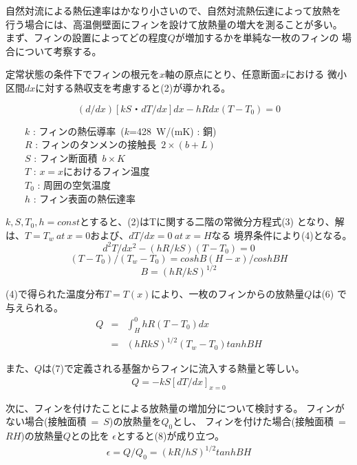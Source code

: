 \documentclass[twocolumn, 10pt,a4j]{jsarticle}
\begin{document}
  自然対流による熱伝達率はかなり小さいので、自然対流熱伝達によって放熱を
  行う場合には、高温側壁面にフィンを設けて放熱量の増大を測ることが多い。
  まず、フィンの設置によってどの程度$Q$が増加するかを単純な一枚のフィンの
  場合について考察する。
    \par 定常状態の条件下でフィンの根元を$x$軸の原点にとり、任意断面$x$における
  微小区間$dx$に対する熱収支を考慮すると(2)が導かれる。
    \begin{center}
      \begin{equation}
        (d/dx)[kS・dT / dx]dx - hRdx(T - T_{0}) = 0
      \end{equation}
      \begin{flushleft}
        \ \ \ \ $k$ : フィンの熱伝導率\ ($k$=428\ W/(mK) : 銅) \\
        \ \ \ \ $R$ : フィンのタンメンの接触長\ $2 \times (b+L)$ \\
        \ \ \ \ $S$ : フィン断面積\ $b \times K$ \\
        \ \ \ \ $T$ : $x=x$におけるフィン温度 \\
        \ \ \ \ $T_{0}$ : 周囲の空気温度 \\
        \ \ \ \ $h$ : フィン表面の熱伝達率  
      \end{flushleft}
    \end{center}
    \par $k, S, T_{0}, h = const$とすると、(2)はTに関する二階の常微分方程式(3)
    となり、解は、$T=T_{w}\ at\ x = 0$および、$dT/dx = 0\ at\ x = H$なる
    境界条件により(4)となる。
      \begin{equation}
        d^{2}T / dx^{2} - (hR / kS)(T - T_{0})=0
      \end{equation}
      \begin{equation}
        (T - T_{0}) / (T_{w} - T_{0}) = coshB(H - x) / cosh BH
      \end{equation}
      \begin{equation}
        B = (hR / kS)^{1/2}
      \end{equation}
    
    \par (4)で得られた温度分布$T=T(x)$により、一枚のフィンからの放熱量$Q$は(6)
    で与えられる。
    \begin{eqnarray}
      Q &=& \int_H^0 hR(T - T_{0})dx \nonumber \\
        &=& (hRkS)^{1/2} (T_{w} - T_{0})tanh BH
    \end{eqnarray}
      \par また、$Q$は(7)で定義される基盤からフィンに流入する熱量と等しい。
    \begin{eqnarray}
      Q = -kS[dT / dx]_{x=0}
    \end{eqnarray}
      \par 次に、フィンを付けたことによる放熱量の増加分について検討する。
    フィンがない場合(接触面積\ =\ $S$)の放熱量を$Q_{0}$とし、
    フィンを付けた場合(接触面積\ =\ $RH$)の放熱量$Q$との比を
    $\epsilon$とすると(8)が成り立つ。
    \begin{eqnarray}
      \epsilon = Q/Q_{0} = (kR / hS)^{1/2}tanh BH
    \end{eqnarray}
\end{document}
